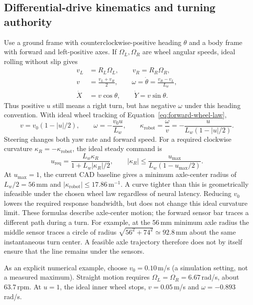 \subsection{Differential-drive kinematics and turning authority}
Use a ground frame with counterclockwise-positive heading $\theta$ and a body frame with forward and left-positive axes. If $\Omega_L,\Omega_R$ are wheel angular speeds, ideal rolling without slip gives
\begin{align}
 v_L&=R_L\Omega_L,\qquad v_R=R_R\Omega_R,\\
 v&=\frac{v_L+v_R}{2},\qquad
 \omega=\dot\theta=\frac{v_R-v_L}{L_w},\\
 \dot X&=v\cos\theta,\qquad \dot Y=v\sin\theta.
 \label{eq:robot-kinematics}
\end{align}
Thus positive $u$ still means a right turn, but has negative $\omega$ under this heading convention. With ideal wheel tracking of Equation~\eqref{eq:forward-wheel-law},
\begin{equation}
 v=v_0(1-|u|/2),\qquad \omega=-\frac{v_0u}{L_w},\qquad
 \kappa_{\mathrm{robot}}=\frac{\omega}{v}
   =-\frac{u}{L_w(1-|u|/2)}.
 \label{eq:robot-curvature}
\end{equation}
Steering changes both yaw rate and forward speed. For a required clockwise curvature $\kappa_R=-\kappa_{\mathrm{robot}}$, the ideal steady command is
\begin{equation}
 u_{\mathrm{req}}=\frac{L_w\kappa_R}{1+L_w|\kappa_R|/2},\qquad
 |\kappa_R|\le\frac{u_{\max}}{L_w(1-u_{\max}/2)}.
 \label{eq:curvature-authority}
\end{equation}
At $u_{\max}=1$, the current CAD baseline gives a minimum axle-center radius of $L_w/2=56$\,mm and $|\kappa_{\mathrm{robot}}|\le17.86$\,m$^{-1}$. A curve tighter than this is geometrically infeasible under the chosen wheel law regardless of neural latency. Reducing $v_0$ lowers the required response bandwidth, but does not change this ideal curvature limit. These formulas describe axle-center motion; the forward sensor bar traces a different path during a turn. For example, at the 56\,mm minimum axle radius the middle sensor traces a circle of radius $\sqrt{56^2+74^2}\simeq92.8$\,mm about the same instantaneous turn center. A feasible axle trajectory therefore does not by itself ensure that the line remains under the sensors.

As an explicit numerical example, choose $v_0=0.10$\,m/s (a simulation setting, not a measured maximum). Straight motion requires $\Omega_L=\Omega_R=6.67$\,rad/s, about 63.7\,rpm. At $u=1$, the ideal inner wheel stops, $v=0.05$\,m/s and $\omega=-0.893$\,rad/s.

